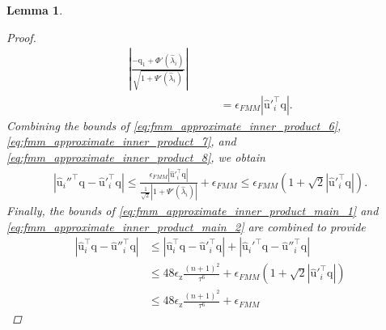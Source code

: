 \documentclass{article}
\newcommand{\labs}{\left|}
\newcommand{\rabs}{\right|}
\newcommand{\lpar}{\left(}
\newcommand{\rpar}{\right)}
\newtheorem{lemma}{Lemma}[section]
\newcommand\vecq{\boldsymbol{\mathrm{q}}}
\newcommand\vecz{\boldsymbol{\mathrm{z}}}
\newcommand\vecuhat{\widehat{\boldsymbol{\mathrm{u}}}}
\begin{document}
\begin{lemma}
\begin{proof}
\begin{align}
            \labs
                \frac{
                    -\vecq_1
                    +
                    \Phi'(\widehat\lambda_i)
                }
                {
                \sqrt{1+\Psi'(\widehat\lambda_i)}
                }
            \rabs
            \nonumber
            \\
            &\qquad=
            \epsilon_{FMM}
            \labs
                \vecuhat'^\top_i\vecq
            \rabs.
            \label{eq:fmm_approximate_inner_product_8}
        \end{align}
        Combining the bounds of \eqref{eq:fmm_approximate_inner_product_6}, \eqref{eq:fmm_approximate_inner_product_7}, and \eqref{eq:fmm_approximate_inner_product_8}, we obtain
        \begin{align}
            \labs \vecuhat_i''^\top \vecq - \vecuhat'^\top_i\vecq \rabs
            \leq
            \frac{
                \epsilon_{FMM}
                \labs
                    \vecuhat'^\top_i\vecq
                \rabs
            }{
                \frac{1}{\sqrt{2}}
                \labs
                1+\Psi'(\widehat\lambda_i)
            \rabs}
            +\epsilon_{FMM}
            \leq
            \epsilon_{FMM}
            \lpar
                1
                +
                \sqrt{2}
                \labs
                    \vecuhat'^\top_i\vecq
                \rabs
            \rpar.
            \label{eq:fmm_approximate_inner_product_main_2}
        \end{align}
        Finally, the bounds of \eqref{eq:fmm_approximate_inner_product_main_1} and \eqref{eq:fmm_approximate_inner_product_main_2} are combined to provide
        \begin{align*}
            \labs \vecuhat_i^\top \vecq - \vecuhat''^\top_i\vecq\rabs
            &\leq
            \labs
                \vecuhat_i^\top \vecq - \vecuhat'^\top_i\vecq 
            \rabs
            +
            \labs
                \vecuhat_i'^\top \vecq - \vecuhat''^\top_i\vecq 
            \rabs
            \\
            &\leq
            48\epsilon_{\vecz}
                \tfrac{(n+1)^2}{\tau^6}
            +
            \epsilon_{FMM}
            \lpar
                1
                +
                \sqrt{2}
                \labs
                    \vecuhat'^\top_i\vecq
                \rabs
            \rpar
            \\
            &\leq
            48\epsilon_{\vecz}
                \tfrac{(n+1)^2}{\tau^6}
            +
            \epsilon_{FMM}

\end{align*}
\end{proof}
\end{lemma}
\end{document}
